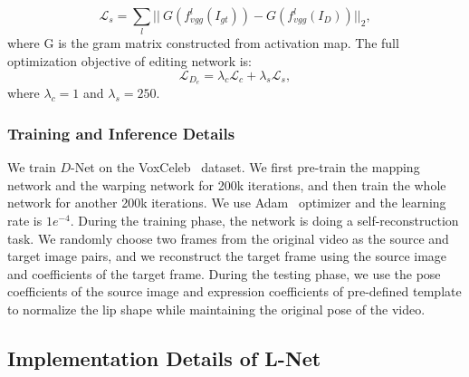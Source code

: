 \begin{equation}
\mathcal{L}_{s} = \sum_l \vert\vert\ G(f_{vgg}^l(I_{gt})) - G(f_{vgg}^l(I_{D}))\vert\vert_2,
\end{equation}
where G is the gram matrix constructed from activation map.
The full optimization objective of editing network is:
\begin{equation}
\mathcal{L}_{D_e} = \lambda_{c} \mathcal{L}_{c} + \lambda_{s} \mathcal{L}_{s},
\end{equation}
\noindent where $\lambda_{c}=1$ and $\lambda_{s}=250$.

\subsubsection{Training and Inference Details}
We train $D$-Net on the VoxCeleb~\cite{voxceleb} dataset. We first pre-train the mapping network and the warping network for 200k iterations, and then train the whole network for another 200k iterations. We use Adam~\cite{adam} optimizer and the learning rate is $1e^{-4}$. 
During the training phase, the network is doing a self-reconstruction task. We randomly choose two frames from the original video as the source and target image pairs, and we reconstruct the target frame using the source image and coefficients of the target frame. 
During the testing phase, we use the pose coefficients of the source image and expression coefficients of pre-defined template to normalize the lip shape while maintaining the original pose of the video.

\subsection{Implementation Details of L-Net}





